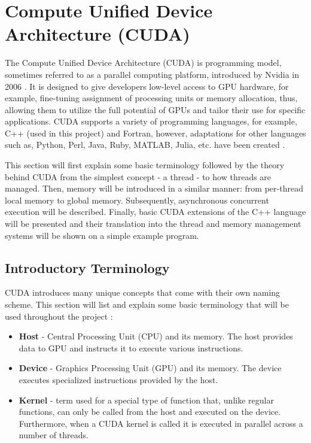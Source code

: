 \section{Compute Unified Device Architecture (CUDA)}\label{Section:theory-CUDA}
The Compute Unified Device Architecture (CUDA) is programming model, sometimes referred to as a parallel computing platform, introduced by Nvidia in 2006 \cite{Oh10September2012}. It is designed to give developers low-level access to GPU hardware, for example, fine-tuning assignment of processing units or memory allocation, thus, allowing them to utilize the full potential of GPUs and tailor their use for specific applications. CUDA supports a variety of programming languages, for example, C++ (used in this project) and Fortran, however, adaptations for other languages such as, Python, Perl, Java, Ruby, MATLAB, Julia, etc. have been created \cite{OsGyRFLMngy0j8Pv}.
\par This section will first explain some basic terminology followed by the theory behind CUDA from the simplest concept - a thread - to how threads are managed. Then, memory will be introduced in a similar manner: from per-thread local memory to global memory. Subsequently, asynchronous concurrent execution will be described. Finally, basic CUDA extensions of the C++ language will be presented and their translation into the thread and memory management systems will be shown on a simple example program.

\subsection{Introductory Terminology}\label{Subsection:theory-CUDA-introductory-terminology}
CUDA introduces many unique concepts that come with their own naming scheme. This section will list and explain some basic terminology that will be used throughout the project \cite{Ruetsch2008}:
\begin{itemize}
	\item \textbf{Host} - Central Processing Unit (CPU) and its memory. The host provides data to GPU and instructs it to execute various instructions.
	\item \textbf{Device} - Graphics Processing Unit (GPU) and its memory. The device executes specialized instructions provided by the host.
	\item \textbf{Kernel} - term used for a special type of function that, unlike regular functions, can only be called from the host and executed on the device. Furthermore, when a CUDA kernel is called it is executed in parallel across a number of threads.	
\end{itemize}

